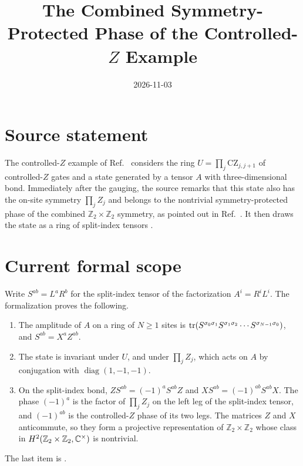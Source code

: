 \documentclass{article}
\title{The Combined Symmetry-Protected Phase of the Controlled-$Z$ Example}
\author{}
\date{2026-11-03}
\begin{document}
\maketitle
{}

\section{Source statement}

The controlled-$Z$ example of
Ref.~\cite[lines~3794--3968]{FrancoRubio2025MPUGauging} considers the ring
$U=\prod_j\mathrm{CZ}_{j,j+1}$ of controlled-$Z$ gates and a state generated by
a tensor $A$ with three-dimensional bond. Immediately after the gauging, the
source remarks \cite[line~3970]{FrancoRubio2025MPUGauging} that this state
also has the on-site symmetry $\prod_jZ_j$ and belongs to the nontrivial
symmetry-protected phase of the combined $\mathbb{Z}_2\times\mathbb{Z}_2$ symmetry, as pointed
out in Ref.~\cite{Stephen2024SIMPS}. It then draws the state as a ring of
split-index tensors \cite[lines~3970--4001]{FrancoRubio2025MPUGauging}.

\section{Current formal scope}

Write $S^{ab}=L^aR^b$ for the split-index tensor of the factorization
$A^i=R^iL^i$. The formalization proves the following.
\begin{enumerate}
    \item The amplitude of $A$ on a ring of $N\geq1$ sites is
          $\operatorname{tr}(S^{\sigma_0\sigma_1}S^{\sigma_1\sigma_2}\cdots
              S^{\sigma_{N-1}\sigma_0})$, and $S^{ab}=X^aZ^{ab}$.
    \item The state is invariant under $U$, and under $\prod_jZ_j$, which
          acts on $A$ by conjugation with $\operatorname{diag}(1,-1,-1)$.
    \item On the split-index bond, $Z S^{ab}=(-1)^aS^{ab}Z$ and
          $XS^{ab}=(-1)^{ab}S^{ab}X$. The phase $(-1)^a$ is the factor of
          $\prod_jZ_j$ on the left leg of the split-index tensor, and
          $(-1)^{ab}$ is the controlled-$Z$ phase of its two legs. The
          matrices $Z$ and $X$ anticommute, so they form a projective
          representation of $\mathbb{Z}_2\times\mathbb{Z}_2$ whose class in
          $H^2(\mathbb{Z}_2\times\mathbb{Z}_2,\mathbb{C}^\times)$ is nontrivial.
\end{enumerate}
The last item is
.
\end{document}
